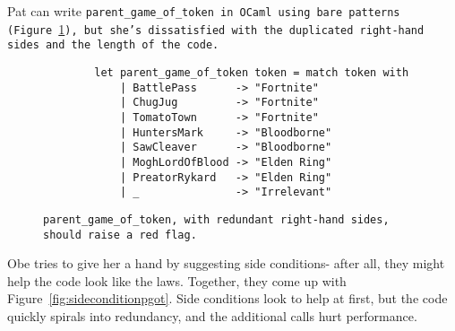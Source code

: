 \documentclass[manuscript,screen,review, 12pt]{acmart}
\begin{document}
\begin{outline}[enumerate]
        
        
        Pat can write \tt{parent\_game\_of\_token} in OCaml using bare patterns
        (Figure~\ref{fig:barepgot}), but she's dissatisfied with the duplicated
        right-hand sides and the length of the code. 
        
        
        \begin{figure}
            \begin{center}
                \begin{verbatim}
        let parent_game_of_token token = match token with 
            | BattlePass      -> "Fortnite"
            | ChugJug         -> "Fortnite"
            | TomatoTown      -> "Fortnite"
            | HuntersMark     -> "Bloodborne"
            | SawCleaver      -> "Bloodborne"
            | MoghLordOfBlood -> "Elden Ring"
            | PreatorRykard   -> "Elden Ring"
            | _               -> "Irrelevant"
                \end{verbatim}
            \end{center}    

        \caption{\tt{parent\_game\_of\_token}, with redundant right-hand sides,
        should raise a red flag.} 
        \label{fig:barepgot}
        \end{figure}

        Obe tries to give her a hand by suggesting side conditions- after all,
        they might help the code look like the laws. Together, they come up with
        Figure~\ref{fig:sideconditionpgot}. Side conditions look to help at
        first, but the code quickly spirals into redundancy, and the additional
        calls hurt performance. 


\end{outline}
\end{document}
